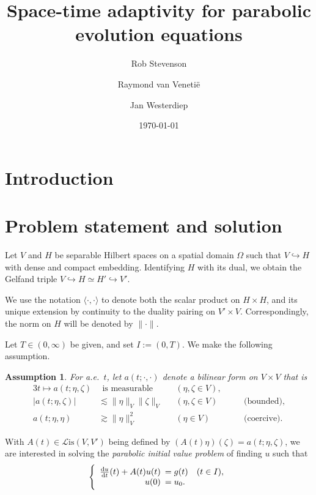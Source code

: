 \documentclass[11pt,a4paper,oneside,english]{amsart}
\title{Space-time adaptivity for parabolic evolution equations}
\author{Rob Stevenson \and Raymond van Veneti\"e \and Jan Westerdiep}
\date{\today}
\numberwithin{equation}{section}
\numberwithin{theorem}{section}
\newtheorem{assum}[theorem]{Assumption}
\theoremstyle{definition}
\newcommand{\la}{\langle}
\newcommand{\ra}{\rangle}
\newcommand{\cL}{\mathcal L}
\newcommand{\Lis}{\cL\mathrm{is}}
\begin{document}
\begin{abstract}
\end{abstract}

\maketitle

\section{Introduction}
\section{Problem statement and solution}
Let $V$ and $H$ be separable Hilbert spaces on a spatial domain $\Omega$ such that
$V \hookrightarrow H$ with dense and compact embedding. Identifying $H$ with its
dual, we obtain the Gelfand triple $V \hookrightarrow H \simeq H' \hookrightarrow V'$.

We use the notation $\la \cdot,\cdot \ra$ to denote both the scalar product
on $H \times H$, and its unique extension by continuity to the duality pairing on
$V' \times V$. Correspondingly, the norm on $H$ will be denoted by $\|\cdot\|$.

Let $T \in (0, \infty)$ be given, and set $I := (0, T)$. We make the following assumption.
\begin{assum}
  \label{assum:a}
  For a.e.~$t$, let $a(t;\cdot,\cdot)$ denote a bilinear form on $V \times V$ that is
  \begin{alignat*}{3}
    t \mapsto a(t; \eta, \zeta) & ~~ \text{is measurable} \quad && (\eta, \zeta \in V), \\
    |a(t;\eta,\zeta)| & \lesssim  \|\eta\|_{V} \|\zeta\|_{V} &&(\eta,\zeta \in V) &\quad&\text{(bounded)}, \\
     a(t;\eta,\eta)   & \gtrsim   \|\eta\|_{V}^2 &&(\eta \in {V}) &&\text{(coercive)}.
  \end{alignat*}
\end{assum}

With $A(t) \in \Lis({V},V')$ being defined by $ (A(t) \eta)(\zeta)=a(t;\eta,\zeta)$,
we are interested in solving the {\em parabolic initial value problem} of finding
$u$ such that
\begin{equation}
  \label{eqn:ibvp}
  \left\{
    \begin{array}{rl}
      \frac{\dif u}{\dif t}(t) +A(t) u(t)&\!\!\!= g(t) \quad(t \in I),\\
      u(0) &\!\!\!= u_0.
    \end{array}
  \right.
\end{equation}
\end{document}
